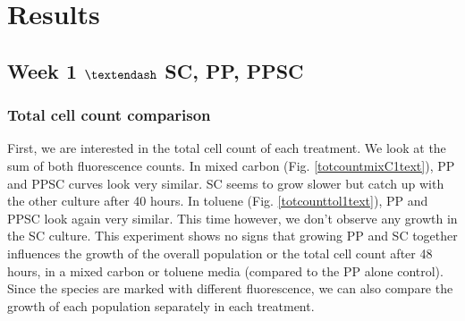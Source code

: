 \documentclass[a4paper, 10pt, conference]{ieeeconf}   %
\begin{document}
\section{Results}
\subsection{Week 1 $\textendash$ SC, PP, PPSC}
\subsubsection{Total cell count comparison}


First, we are interested in the total cell count of each treatment. We look at the sum of both fluorescence counts.
In mixed carbon (Fig. \ref{totcountmixC1text}), PP and PPSC curves look very similar. SC seems to grow slower but catch up with the other culture after 40 hours.
In toluene (Fig. \ref{totcounttol1text}), PP and PPSC look again very similar. This time however, 
we don’t observe any growth in the SC culture.
This experiment shows no signs that growing PP and SC together influences the growth of the overall population or the total cell count after 48 hours, in a mixed carbon or toluene media (compared to the PP alone control).
Since the species are marked with different fluorescence, we can also compare the growth of each population separately in each treatment.\newline

%	
%	
%	
\end{document}
